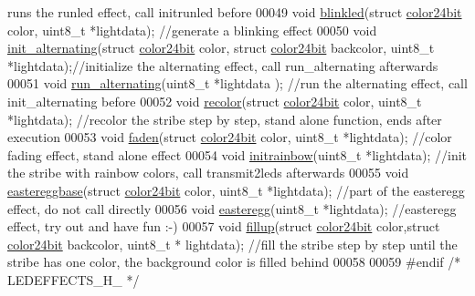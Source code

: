 \begin{DoxyCode}
{      runs the runled effect, call initrunled before}
00049 \textcolor{keywordtype}{void} \hyperlink{_led_effects_8h_a9fd87d01d5cc4ce5fce6ddca55ebaf37}{blinkled}(\textcolor{keyword}{struct} \hyperlink{structcolor24bit}{color24bit} color, uint8\_t *lightdata);                                       \textcolor{comment}{
      //generate a blinking effect}
00050 \textcolor{keywordtype}{void} \hyperlink{_led_effects_8h_af67b7638a175e4971f25df5a5db3d8d0}{init\_alternating}(\textcolor{keyword}{struct} \hyperlink{structcolor24bit}{color24bit} color, \textcolor{keyword}{struct} 
      \hyperlink{structcolor24bit}{color24bit} backcolor, uint8\_t *lightdata);\textcolor{comment}{//initialize the alternating effect, call
       run\_alternating afterwards}
00051 \textcolor{keywordtype}{void} \hyperlink{_led_effects_8h_a5bde1e9e7fc19a9916f1ec02d8fbcd6c}{run\_alternating}(uint8\_t *lightdata );                                                       \textcolor{comment}{
      //run the alternating effect, call init\_alternating before}
00052 \textcolor{keywordtype}{void} \hyperlink{_led_effects_8h_a448758d76f47ea6fed4beb349196363f}{recolor}(\textcolor{keyword}{struct} \hyperlink{structcolor24bit}{color24bit} color, uint8\_t *lightdata);                                     \textcolor{comment}{
      //recolor the stribe step by step, stand alone function, ends after execution}
00053 \textcolor{keywordtype}{void} \hyperlink{_led_effects_8h_a71d3b2ff21a63b48a01461e74be0c2b8}{faden}(\textcolor{keyword}{struct} \hyperlink{structcolor24bit}{color24bit} color, uint8\_t *lightdata);                                     \textcolor{comment}{
      //color fading effect, stand alone effect}
00054 \textcolor{keywordtype}{void} \hyperlink{_led_effects_8h_a9d0f91360c87b851925bf05be5352435}{initrainbow}(uint8\_t *lightdata);                                                            \textcolor{comment}{
      //init the stribe with rainbow colors, call transmit2leds afterwards}
00055 \textcolor{keywordtype}{void} \hyperlink{_led_effects_8h_ac83bd19da7ebd3c475e3667e4229db41}{eastereggbase}(\textcolor{keyword}{struct} \hyperlink{structcolor24bit}{color24bit} color, uint8\_t *lightdata);                             \textcolor{comment}{
      //part of the easteregg effect, do not call directly}
00056 \textcolor{keywordtype}{void} \hyperlink{_led_effects_8h_a25e09bcb1481b20ebc2a27e7098b5115}{easteregg}(uint8\_t *lightdata);                                                                \textcolor{comment}{
      //easteregg effect, try out and have fun :-)}
00057 \textcolor{keywordtype}{void} \hyperlink{_led_effects_8h_a99174e2b381d7ec6667d29352e6eca1b}{fillup}(\textcolor{keyword}{struct} \hyperlink{structcolor24bit}{color24bit} color,\textcolor{keyword}{struct} \hyperlink{structcolor24bit}{color24bit} backcolor, uint8\_t *
      lightdata);         \textcolor{comment}{//fill the stribe step by step until the stribe has one color, the background color is filled
       behind}
00058 
00059 \textcolor{preprocessor}{#endif }\textcolor{comment}{/* LEDEFFECTS\_H\_ */}\textcolor{preprocessor}{}
\end{DoxyCode}
